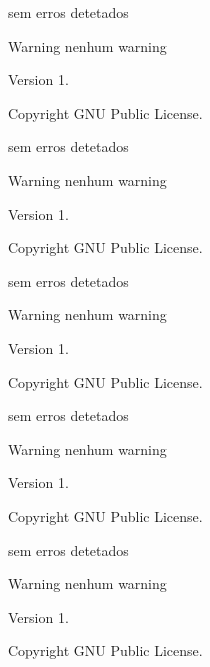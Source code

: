 
\begin{DoxyRefList}
\item[\label{bug__bug000001}%
\hypertarget{bug__bug000001}{}%
File \hyperlink{estruturas_8h}{estruturas.h} ]sem erros detetados \begin{DoxyWarning}{Warning}
nenhum warning 
\end{DoxyWarning}
\begin{DoxyVersion}{Version}
1. 
\end{DoxyVersion}
\begin{DoxyCopyright}{Copyright}
G\+N\+U Public License.  
\end{DoxyCopyright}

\item[\label{bug__bug000002}%
\hypertarget{bug__bug000002}{}%
File \hyperlink{includes__defines_8h}{includes\+\_\+defines.h} ]sem erros detetados \begin{DoxyWarning}{Warning}
nenhum warning 
\end{DoxyWarning}
\begin{DoxyVersion}{Version}
1. 
\end{DoxyVersion}
\begin{DoxyCopyright}{Copyright}
G\+N\+U Public License.  
\end{DoxyCopyright}

\item[\label{bug__bug000003}%
\hypertarget{bug__bug000003}{}%
File \hyperlink{jogogen_8h}{jogogen.h} ]sem erros detetados \begin{DoxyWarning}{Warning}
nenhum warning 
\end{DoxyWarning}
\begin{DoxyVersion}{Version}
1. 
\end{DoxyVersion}
\begin{DoxyCopyright}{Copyright}
G\+N\+U Public License.  
\end{DoxyCopyright}

\item[\label{bug__bug000004}%
\hypertarget{bug__bug000004}{}%
File \hyperlink{login_8h}{login.h} ]sem erros detetados \begin{DoxyWarning}{Warning}
nenhum warning 
\end{DoxyWarning}
\begin{DoxyVersion}{Version}
1. 
\end{DoxyVersion}
\begin{DoxyCopyright}{Copyright}
G\+N\+U Public License.  
\end{DoxyCopyright}

\item[\label{bug__bug000005}%
\hypertarget{bug__bug000005}{}%
File \hyperlink{main_8c}{main.c} ]sem erros detetados \begin{DoxyWarning}{Warning}
nenhum warning 
\end{DoxyWarning}
\begin{DoxyVersion}{Version}
1. 
\end{DoxyVersion}
\begin{DoxyCopyright}{Copyright}
G\+N\+U Public License. 
\end{DoxyCopyright}

\end{DoxyRefList}
